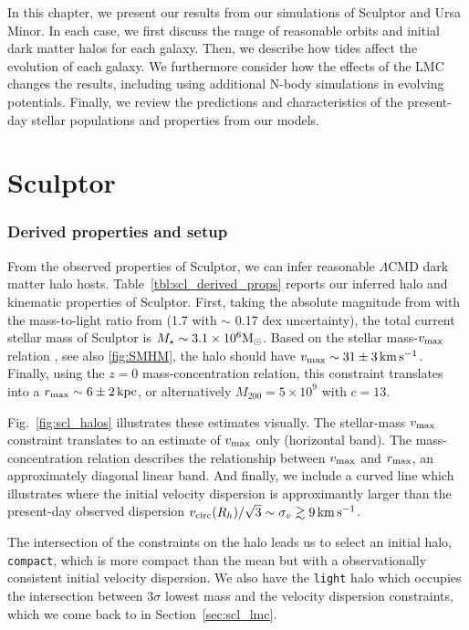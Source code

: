 In this chapter, we present our results from our simulations of Sculptor
and Ursa Minor. In each case, we first discuss the range of reasonable
orbits and initial dark matter halos for each galaxy. Then, we describe
how tides affect the evolution of each galaxy. We furthermore consider
how the effects of the LMC changes the results, including using
additional N-body simulations in evolving potentials. Finally, we review
the predictions and characteristics of the present-day stellar
populations and properties from our models.

\section{Sculptor}\label{sculptor}

\subsubsection{Derived properties and
setup}\label{derived-properties-and-setup}

From the observed properties of Sculptor, we can infer reasonable
\(\Lambda\)CMD dark matter halo hosts. Table~\ref{tbl:scl_derived_props}
reports our inferred halo and kinematic properties of Sculptor. First,
taking the absolute magnitude from \citet{munoz+2018} with the
mass-to-light ratio from \citet{woo+courteau+dekel2008} (1.7 with
\(\sim\) 0.17 dex uncertainty), the total current stellar mass of
Sculptor is \(M_\star \sim 3.1 \times 10^6 {\rm M}_{\odot}\). Based on the stellar
mass-\(v_{\rm max}\) relation \citep[from][]{fattahi+2018}, see also
\ref{fig:SMHM}, the halo should have
\(v_{\rm max} \sim 31 \pm 3 \,{\rm km\,s^{-1}}\). Finally, using the
\citet{ludlow+2016} \(z=0\) mass-concentration relation, this constraint
translates into a \(r_{\rm max} \sim 6 \pm 2\,{\rm kpc}\), or
alternatively \(M_{200} = 5\times10^9\) with \(c=13\).

Fig.~\ref{fig:scl_halos} illustrates these estimates visually. The
stellar-mass \(v_{\rm max}\) constraint translates to an estimate of
\(v_{\rm max}\) only (horizontal band). The mass-concentration relation
describes the relationship between \(v_{\rm max}\) and \(r_{\rm max}\),
an approximately diagonal linear band. And finally, we include a curved
line which illustrates where the initial velocity dispersion is
approximantly larger than the present-day observed dispersion
\(v_{\rm circ}(R_h) / \sqrt{3} \sim \sigma_v \gtrsim 9\,{\rm km\,s^{-1}}\).

The intersection of the constraints on the halo leads us to select an
initial halo, \texttt{compact}, which is more compact than the mean but
with a observationally consistent initial velocity dispersion. We also
have the \texttt{light} halo which occupies the intersection between
3\(\sigma\) lowest mass and the velocity dispersion constraints, which
we come back to in Section~\ref{sec:scl_lmc}.

